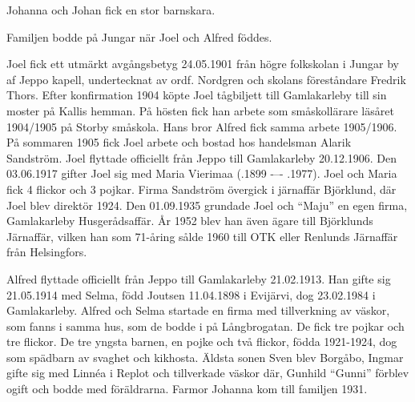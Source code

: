 Johanna och Johan fick en stor barnskara.
\begin{jhchildren}
  \item {}
  \item {}
  \item {}
  \item {}
  \item {}
  \item {}
  \item {}
  \item {}
  \item {}
\end{jhchildren}
Familjen bodde på Jungar när Joel och Alfred föddes.

Joel fick ett utmärkt avgångsbetyg 24.05.1901 från högre folkskolan i Jungar by af Jeppo kapell, undertecknat av ordf. Nordgren och skolans	föreståndare Fredrik Thors. Efter konfirmation 1904 köpte Joel tågbiljett	till Gamlakarleby till sin moster på Kallis hemman. På hösten fick han arbete som småskollärare läsåret 1904/1905 på Storby småskola. Hans	bror Alfred fick samma arbete 1905/1906. På sommaren 1905 fick Joel arbete och bostad hos handelsman Alarik Sandström. Joel flyttade officiellt från Jeppo till Gamlakarleby 20.12.1906. Den 03.06.1917 gifter Joel sig med Maria Vierimaa (.1899  -–-  .1977). Joel och Maria fick 4 flickor och 3 pojkar. Firma Sandström övergick i järnaffär Björklund, där Joel blev direktör 1924. Den 01.09.1935 grundade Joel och ``Maju'' en egen firma, Gamlakarleby Husgerådsaffär. År 1952 blev	han även ägare till Björklunds Järnaffär, vilken han som 71-åring sålde 1960 till OTK eller Renlunds Järnaffär från Helsingfors.

Alfred flyttade officiellt från Jeppo till Gamlakarleby 21.02.1913. Han gifte sig 21.05.1914 med Selma, född Joutsen 11.04.1898 i Evijärvi, dog 23.02.1984 i Gamlakarleby. Alfred och Selma startade en firma med tillverkning av väskor, som fanns i samma hus, som de bodde i på Långbrogatan. De fick tre pojkar och tre flickor. De tre yngsta barnen, en pojke och två flickor, födda 1921-1924, dog som spädbarn av svaghet och kikhosta. Äldsta sonen Sven blev Borgåbo, Ingmar gifte sig med Linnéa i Replot och tillverkade väskor där, Gunhild ``Gunni'' förblev ogift och bodde med föräldrarna. Farmor Johanna kom till familjen 1931.

